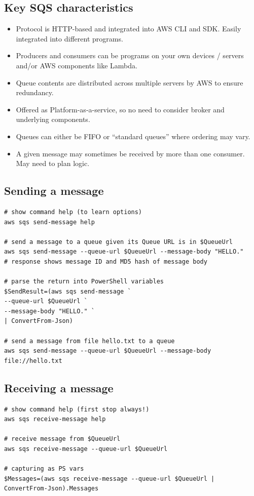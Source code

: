 \documentclass{pgnotes}
\begin{document}
\subsection{Key SQS characteristics}\label{key-sqs-characteristics}

\begin{itemize}
\item
  Protocol is HTTP-based and integrated into AWS CLI and SDK. Easily
  integrated into different programs.
\item
  Producers and consumers can be programs on your own devices / servers
  and/or AWS components like Lambda.
\item
  Queue contents are distributed across multiple servers by AWS to
  ensure redundancy.
\item
  Offered as Platform-as-a-service, so no need to consider broker and
  underlying components.
\item
  Queues can either be FIFO or ``standard queues'' where ordering may
  vary.
\item
  A given message may sometimes be received by more than one consumer.
  May need to plan logic.
\end{itemize}

\subsection{Sending a message}\label{sending-a-message}

\begin{verbatim}
# show command help (to learn options)
aws sqs send-message help

# send a message to a queue given its Queue URL is in $QueueUrl
aws sqs send-message --queue-url $QueueUrl --message-body "HELLO."
# response shows message ID and MD5 hash of message body

# parse the return into PowerShell variables
$SendResult=(aws sqs send-message `
--queue-url $QueueUrl `
--message-body "HELLO." `
| ConvertFrom-Json)

# send a message from file hello.txt to a queue
aws sqs send-message --queue-url $QueueUrl --message-body file://hello.txt
\end{verbatim}

\subsection{Receiving a message}\label{receiving-a-message}

\begin{verbatim}
# show command help (first stop always!)
aws sqs receive-message help

# receive message from $QueueUrl
aws sqs receive-message --queue-url $QueueUrl 

# capturing as PS vars
$Messages=(aws sqs receive-message --queue-url $QueueUrl | ConvertFrom-Json).Messages
\end{verbatim}
\end{document}
